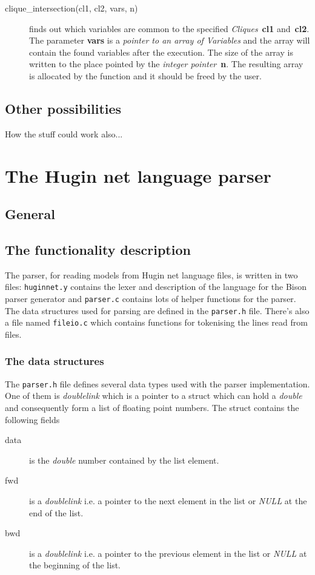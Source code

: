 \documentclass[12pt,a4paper]{report}
\newcommand{\cdatatype}[1]{{\it #1}}
\newcommand{\cfilename}[1]{\texttt{#1}}
\newcommand{\cparameter}[1]{\textbf{#1}}
\begin{document}
\begin{description}
\item[clique\_intersection(cl1, cl2, vars, n)] finds out which
variables are common to the specified \cdatatype{Cliques}~\cparameter{cl1}
and~\cparameter{cl2}. The parameter \cparameter{vars} is a 
\cdatatype{pointer to an array of Variables} and the array will 
contain the found variables  after the execution. The size of the
array is written to the place pointed by the 
\cdatatype{integer pointer}~\cparameter{n}. The resulting array
is allocated by the function and it should be freed by the user.
\end{description}


\subsection{Other possibilities}

How the stuff could work also...


\newpage
\section{The Hugin net language parser}
\subsection{General}


\subsection{The functionality description}
The parser, for reading models from Hugin net language files, is
written in two files: \cfilename{huginnet.y} contains the lexer and 
description of the language for the Bison parser generator and 
\cfilename{parser.c} contains lots of helper functions for the parser. 
The data structures used for parsing are defined in the
\cfilename{parser.h} file. There's also a file named
\cfilename{fileio.c} which contains functions for tokenising the 
lines read from files.

\subsubsection{The data structures}
The \cfilename{parser.h} file defines several data types used with the
parser implementation. One of them is \cdatatype{doublelink} which is a
pointer to a struct which can hold a \cdatatype{double} and consequently
form a list of floating point numbers. The struct contains the
following fields
\begin{description}
\item[data] is the \cdatatype{double} number contained by the list element.

\item[fwd] is a \cdatatype{doublelink} i.e. a pointer to the next element in
the list or \cdatatype{NULL} at the end of the list.

\item[bwd] is a \cdatatype{doublelink} i.e. a pointer to the previous
element in the list or \cdatatype{NULL} at the beginning of the list.
\end{description}
\end{document}
